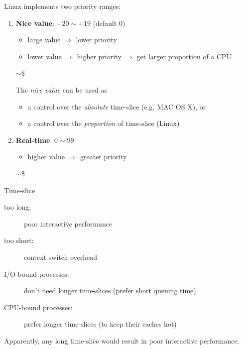 \begin{frame}
    Linux implements two priority ranges:
  \begin{enumerate}
  \item \textbf{Nice value}: $-20 \sim+19$ (default 0)
    \begin{itemize}
    \item large value $\Rightarrow$ lower priority
    \item lower value $\Rightarrow$ higher priority  $\Rightarrow$ get larger proportion
      of a CPU
    \end{itemize}
    \begin{center}
      $\sim$\$ 
    \end{center}
    The \emph{nice value} can be used as 
    \begin{itemize}
    \item a control over the \emph{absolute} time-slice (e.g. MAC OS X), or
    \item a control over the \emph{proportion} of time-slice (Linux)
    \end{itemize}
  \item \textbf{Real-time}: $0\sim99$
    \begin{itemize}
    \item higher value $\Rightarrow$ greater priority
    \end{itemize}
    \begin{center}
      \mbox{$\sim$\$ }
    \end{center}
  \end{enumerate}
\end{frame}

\begin{frame}{Time-slice}
  \begin{description}
  \item[too long:] poor interactive performance
  \item[too short:] context switch overhead
  \item[I/O-bound processes:] don't need longer time-slices (prefer short queuing time)
  \item[CPU-bound processes:] prefer longer time-slices (to keep their caches hot)
  \end{description}
  Apparently, any long time-slice would result in poor interactive performance.
\end{frame}

